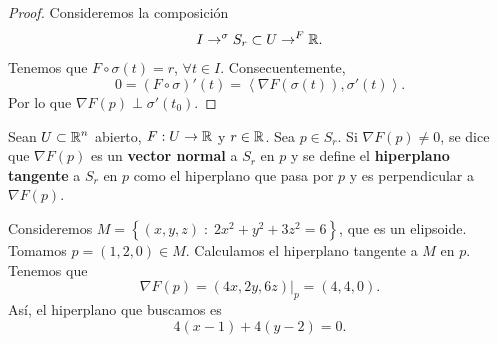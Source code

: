 \begin{proof}
Consideremos la composición
\[I \to ^{\sigma } S_{r} \subset U \to ^{F} \mathbb{R} .\]
Tenemos que $\displaystyle F\circ \sigma\left(t\right) = r $, $\displaystyle \forall t \in I $. Consecuentemente, 
\[0 = \left(F\circ \sigma \right)'\left(t\right) = \left\langle \nabla F\left(\sigma \left(t\right)\right), \sigma'\left(t\right) \right\rangle  .\]
Por lo que $\displaystyle \nabla F\left(p\right) \perp\sigma'\left(t_{0}\right) $.
\end{proof}
\begin{definition}
Sean $\displaystyle U\subset\mathbb{R}^{n} $ abierto, $\displaystyle F:U \to \mathbb{R} $ y $\displaystyle r \in \mathbb{R} $. Sea $\displaystyle p \in S_{r} $. Si $\displaystyle \nabla F\left(p\right)\neq 0 $, se dice que $\displaystyle \nabla F\left(p\right) $ es un \textbf{vector normal} a $\displaystyle S_{r} $ en $\displaystyle p $ y se define el \textbf{hiperplano tangente} a $\displaystyle S_{r} $ en $\displaystyle p $ como el hiperplano que pasa por $\displaystyle p $ y es perpendicular a $\displaystyle \nabla F\left(p\right) $.
\end{definition}
\begin{eg}
	Consideremos $\displaystyle M = \left\{ \left(x,y,z\right) \; : \; 2x^{2} +y^{2}+3z^{2} = 6\right\}  $, que es un elipsoide. Tomamos $\displaystyle p= \left(1,2,0\right) \in M $. Calculamos el hiperplano tangente a $\displaystyle M $ en $\displaystyle p $. Tenemos que 
	\[\nabla F\left(p\right)= \left(4x,2y,6z\right)|_{p}= \left(4,4,0\right) .\]
Así, el hiperplano que buscamos es
\[4\left(x-1\right) + 4\left(y-2\right) = 0 .\]
\end{eg}
